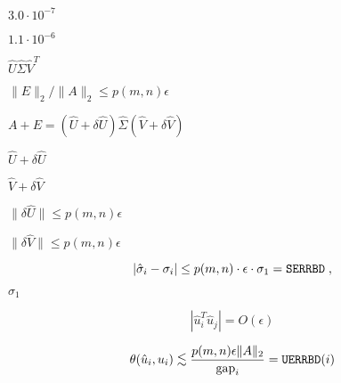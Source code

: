 {\newpage\clearpage
{}%
$3.0 \cdot 10^{-7}$%
\lthtmlinlinemathZ
\lthtmlcheckvsize\clearpage}

{\newpage\clearpage
{}%
$1.1 \cdot 10^{-6}$%
\lthtmlinlinemathZ
\lthtmlcheckvsize\clearpage}

{\newpage\clearpage
{}%
$\hat{U} \hat{\Sigma} \hat{V}^T$%
\lthtmlinlinemathZ
\lthtmlcheckvsize\clearpage}

{\newpage\clearpage
{}%
$\|E\|_2 / \|A\|_2 \leq p(m,n) \epsilon$%
\lthtmlinlinemathZ
\lthtmlcheckvsize\clearpage}

{\newpage\clearpage
{}%
$A+E = (\hat{U} + \delta \hat{U}) \hat{\Sigma} (\hat{V}+ \delta \hat{V})$%
\lthtmlinlinemathZ
\lthtmlcheckvsize\clearpage}

{\newpage\clearpage
{}%
$\hat{U}+ \delta \hat{U}$%
\lthtmlinlinemathZ
\lthtmlcheckvsize\clearpage}

{\newpage\clearpage
{}%
$\hat{V}+ \delta
\hat{V}$%
\lthtmlinlinemathZ
\lthtmlcheckvsize\clearpage}

{\newpage\clearpage
{}%
$\| \delta \hat{U} \| \leq p(m,n) \epsilon$%
\lthtmlinlinemathZ
\lthtmlcheckvsize\clearpage}

{\newpage\clearpage
{}%
$\| \delta \hat{V} \| \leq p(m,n) \epsilon$%
\lthtmlinlinemathZ
\lthtmlcheckvsize\clearpage}

{\newpage\clearpage
{}%
\begin{displaymath}
| \hat{\sigma}_i - \sigma_i | \leq p(m,n) \cdot \epsilon \cdot \sigma_1
= {\tt SERRBD} \; ,
\end{displaymath}%
\lthtmldisplayZ
\lthtmlcheckvsize\clearpage}

{\newpage\clearpage
{}%
$\sigma_1$%
\lthtmlinlinemathZ
\lthtmlcheckvsize\clearpage}

{\newpage\clearpage
{}%
\begin{displaymath}
|\hat{u}_i^T \hat{u}_j | = O( \epsilon )
\end{displaymath}%
\lthtmldisplayZ
\lthtmlcheckvsize\clearpage}

{\newpage\clearpage
{}%
\begin{displaymath}
\theta ( \hat{u}_i , u_i ) \mathrel{\raisebox{-.75ex}{$\mathop{\sim}\limits^{\textstyle <}$}}\frac{p(m,n) \epsilon \|A\|_2}{{\rm gap}_i}
= {\tt UERRBD}(i)
\end{displaymath}%
\lthtmldisplayZ
\lthtmlcheckvsize\clearpage}


